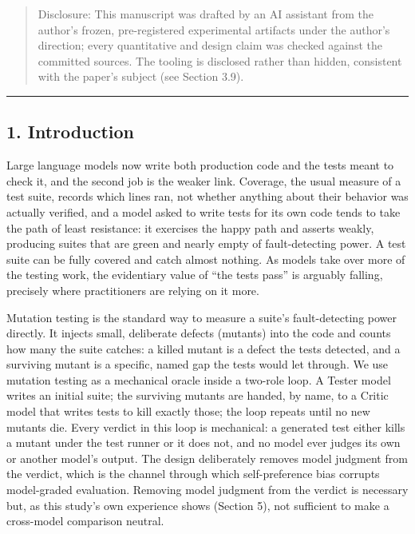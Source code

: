 \documentclass[
  11pt,
]{article}
\begin{document}
\begin{quote}
\small Disclosure: This manuscript was drafted by an AI assistant from the
author's frozen, pre-registered experimental artifacts under the
author's direction; every quantitative and design claim was checked
against the committed sources. The tooling is disclosed rather than
hidden, consistent with the paper's subject (see Section 3.9).
\end{quote}

\begin{center}\rule{0.5\linewidth}{0.5pt}\end{center}

\subsection{1. Introduction}\label{introduction}

Large language models now write both production code and the tests meant
to check it, and the second job is the weaker link. Coverage, the usual
measure of a test suite, records which lines ran, not whether anything
about their behavior was actually verified, and a model asked to write
tests for its own code tends to take the path of least resistance: it
exercises the happy path and asserts weakly, producing suites that are
green and nearly empty of fault-detecting power. A test suite can be
fully covered and catch almost nothing. As models take over more of the
testing work, the evidentiary value of ``the tests pass'' is arguably
falling, precisely where practitioners are relying on it more.

Mutation testing is the standard way to measure a suite's
fault-detecting power directly. It injects small, deliberate defects
(mutants) into the code and counts how many the suite catches: a killed
mutant is a defect the tests detected, and a surviving mutant is a
specific, named gap the tests would let through. We use mutation testing
as a mechanical oracle inside a two-role loop. A Tester model writes an
initial suite; the surviving mutants are handed, by name, to a Critic
model that writes tests to kill exactly those; the loop repeats until no
new mutants die. Every verdict in this loop is mechanical: a generated
test either kills a mutant under the test runner or it does not, and no
model ever judges its own or another model's output. The design
deliberately removes model judgment from the verdict, which is the
channel through which self-preference bias corrupts model-graded
evaluation. Removing model judgment from the verdict is necessary but,
as this study's own experience shows (Section 5), not sufficient to make
a cross-model comparison neutral.
\end{document}
